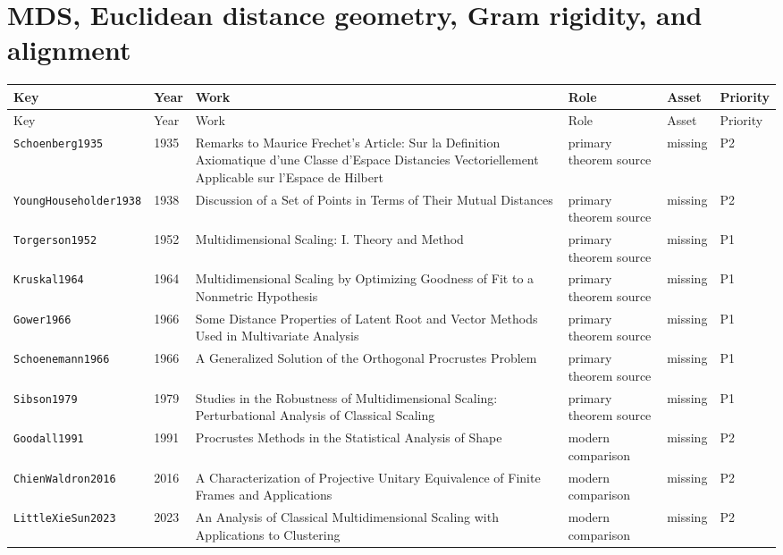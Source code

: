 \documentclass[10pt]{article}
\newcommand{\code}[1]{\texttt{#1}}
\begin{document}
\section*{MDS, Euclidean distance geometry, Gram rigidity, and alignment}
\begin{longtable}{@{}p{}p{}p{}p{}p{}p{}@{}}
\toprule
Key & Year & Work & Role & Asset & Priority \\
\midrule
\endfirsthead
\toprule
Key & Year & Work & Role & Asset & Priority \\
\midrule
\endhead
\code{Schoenberg1935} & 1935 & Remarks to Maurice Frechet's Article: Sur la Definition Axiomatique d'une Classe d'Espace Distancies Vectoriellement Applicable sur l'Espace de Hilbert & primary theorem source & missing & P2 \\
\code{YoungHouseholder1938} & 1938 & Discussion of a Set of Points in Terms of Their Mutual Distances & primary theorem source & missing & P2 \\
\code{Torgerson1952} & 1952 & Multidimensional Scaling: I. Theory and Method & primary theorem source & missing & P1 \\
\code{Kruskal1964} & 1964 & Multidimensional Scaling by Optimizing Goodness of Fit to a Nonmetric Hypothesis & primary theorem source & missing & P1 \\
\code{Gower1966} & 1966 & Some Distance Properties of Latent Root and Vector Methods Used in Multivariate Analysis & primary theorem source & missing & P1 \\
\code{Schoenemann1966} & 1966 & A Generalized Solution of the Orthogonal Procrustes Problem & primary theorem source & missing & P1 \\
\code{Sibson1979} & 1979 & Studies in the Robustness of Multidimensional Scaling: Perturbational Analysis of Classical Scaling & primary theorem source & missing & P1 \\
\code{Goodall1991} & 1991 & Procrustes Methods in the Statistical Analysis of Shape & modern comparison & missing & P2 \\
\code{ChienWaldron2016} & 2016 & A Characterization of Projective Unitary Equivalence of Finite Frames and Applications & modern comparison & missing & P2 \\
\code{LittleXieSun2023} & 2023 & An Analysis of Classical Multidimensional Scaling with Applications to Clustering & modern comparison & missing & P2 \\
\bottomrule
\end{longtable}
\end{document}
